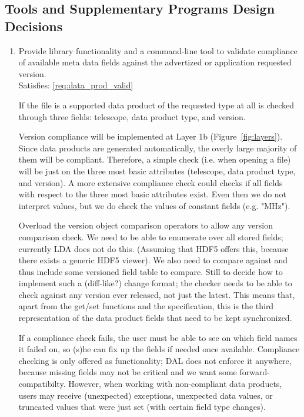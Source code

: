 \documentclass[a4paper,11pt]{article}
\begin{document}
\subsection{Tools and Supplementary Programs Design Decisions} \label{sec:tools_and_suppl_progs_design_decisions}

\begin{enumerate}[resume, label=\it D.\arabic{*}]
\itemsep0em

\item \label{dsg:data_prod_valid} Provide library functionality and a command-line tool to validate compliance of available meta data fields against the advertized or application requested version.\\
Satisfies: \ref{req:data_prod_valid}

If the file is a supported data product of the requested type at all is checked through three fields: telescope, data product type, and version.

Version compliance will be implemented at Layer 1b (Figure~\ref{fig:layers}).
Since data products are generated automatically, the overly large majority of them will be compliant.
Therefore, a simple check (i.e. when opening a file) will be just on the three most basic attributes (telescope, data product type, and version).
A more extensive compliance check could checks if all fields with respect to the three most basic attributes exist.
Even then we do not interpret values, but we do check the values of constant fields (e.g. "MHz").

Overload the version object comparison operators to allow any version comparison check.
We need to be able to enumerate over all stored fields; currently LDA does not do this.
(Assuming that HDF5 offers this, because there exists a generic HDF5 viewer).
We also need to compare against and thus include some versioned field table to compare.
Still to decide how to implement such a (diff-like?) change format; the checker needs to be able to check against any version ever released, not just the latest. %
This means that, apart from the get/set functions and the specification, this is the third representation of the data product fields that need to be kept synchronized.

If a compliance check fails, the user must be able to see on which field names it failed on, so (s)he can fix up the fields if needed once available.
Compliance checking is only offered as functionality; DAL does not enforce it anywhere, because missing fields may not be critical and we want some forward-compatibilty.
However, when working with non-compliant data products, users may receive (unexpected) exceptions, unexpected data values, or truncated values that were just set (with certain field type changes).


\end{enumerate}
\end{document}

